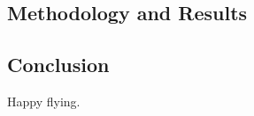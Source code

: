 \documentclass[
]{article}
\begin{document}
\subsection{Methodology and Results}

\subsection{Conclusion}

Happy flying.
\end{document}
